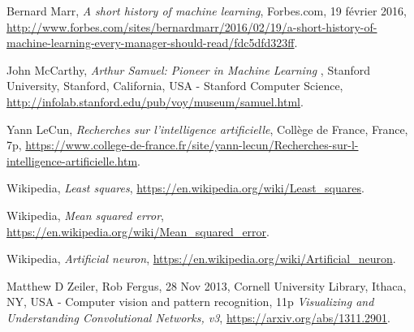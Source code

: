 \documentclass[a4paper,10pt]{report}
\begin{document}
\begin{thebibliography}{9}
  Bernard Marr,
  \emph{A short history of machine learning},
  Forbes.com, 19 février 2016,
  \url{http://www.forbes.com/sites/bernardmarr/2016/02/19/a-short-history-of-machine-learning-every-manager-should-read/fdc5dfd323ff}.

  John McCarthy,
  \emph{Arthur Samuel: Pioneer in Machine Learning },
  Stanford University, Stanford, California, USA -
  Stanford Computer Science,
  \url{http://infolab.stanford.edu/pub/voy/museum/samuel.html}.

  Yann LeCun,
  \emph{Recherches sur l'intelligence artificielle},
  Collège de France, France,
  7p,
  \url{https://www.college-de-france.fr/site/yann-lecun/Recherches-sur-l-intelligence-artificielle.htm}.

  Wikipedia,
  \emph{Least squares},
  \url{https://en.wikipedia.org/wiki/Least_squares}.

  Wikipedia,
  \emph{Mean squared error},
  \url{https://en.wikipedia.org/wiki/Mean_squared_error}.

  Wikipedia,
  \emph{Artificial neuron},
  \url{https://en.wikipedia.org/wiki/Artificial_neuron}.

  Matthew D Zeiler, Rob Fergus,
  28 Nov 2013,
  Cornell University Library, Ithaca, NY, USA -
  Computer vision and pattern recognition,
  11p
  \emph{Visualizing and Understanding Convolutional Networks, v3},
  \url{https://arxiv.org/abs/1311.2901}.
  \end{thebibliography}
\end{document}
